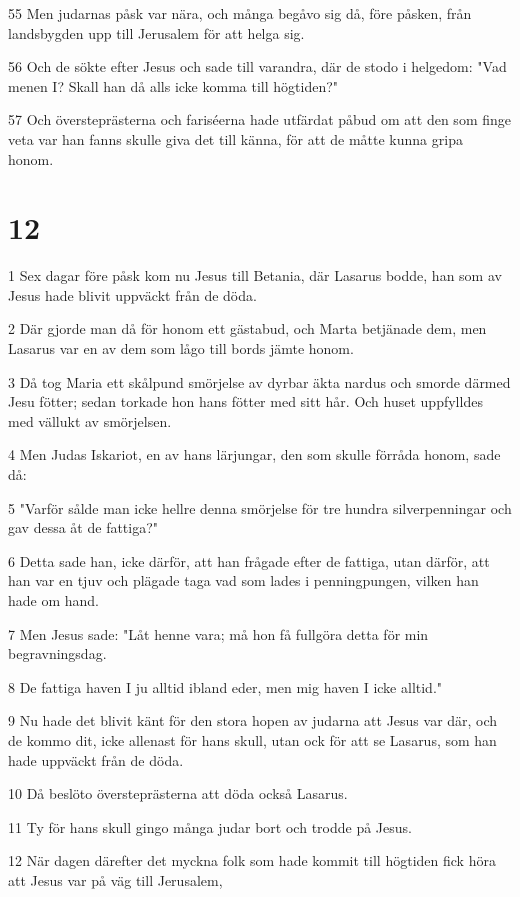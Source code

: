 \par 55 Men judarnas påsk var nära, och många begåvo sig då, före påsken, från landsbygden upp till Jerusalem för att helga sig.
\par 56 Och de sökte efter Jesus och sade till varandra, där de stodo i helgedom: "Vad menen I? Skall han då alls icke komma till högtiden?"
\par 57 Och översteprästerna och fariséerna hade utfärdat påbud om att den som finge veta var han fanns skulle giva det till känna, för att de måtte kunna gripa honom.

\chapter{12}

\par 1 Sex dagar före påsk kom nu Jesus till Betania, där Lasarus bodde, han som av Jesus hade blivit uppväckt från de döda.
\par 2 Där gjorde man då för honom ett gästabud, och Marta betjänade dem, men Lasarus var en av dem som lågo till bords jämte honom.
\par 3 Då tog Maria ett skålpund smörjelse av dyrbar äkta nardus och smorde därmed Jesu fötter; sedan torkade hon hans fötter med sitt hår. Och huset uppfylldes med vällukt av smörjelsen.
\par 4 Men Judas Iskariot, en av hans lärjungar, den som skulle förråda honom, sade då:
\par 5 "Varför sålde man icke hellre denna smörjelse för tre hundra silverpenningar och gav dessa åt de fattiga?"
\par 6 Detta sade han, icke därför, att han frågade efter de fattiga, utan därför, att han var en tjuv och plägade taga vad som lades i penningpungen, vilken han hade om hand.
\par 7 Men Jesus sade: "Låt henne vara; må hon få fullgöra detta för min begravningsdag.
\par 8 De fattiga haven I ju alltid ibland eder, men mig haven I icke alltid."
\par 9 Nu hade det blivit känt för den stora hopen av judarna att Jesus var där, och de kommo dit, icke allenast för hans skull, utan ock för att se Lasarus, som han hade uppväckt från de döda.
\par 10 Då beslöto översteprästerna att döda också Lasarus.
\par 11 Ty för hans skull gingo många judar bort och trodde på Jesus.
\par 12 När dagen därefter det myckna folk som hade kommit till högtiden fick höra att Jesus var på väg till Jerusalem,
